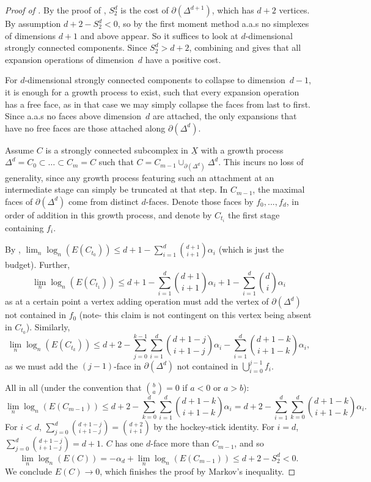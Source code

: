 \documentclass{article}
\theoremstyle{plain}
\theoremstyle{definition}
\theoremstyle{remark}
\newcommand{\di}{dimension}
\begin{document}
\begin{proof}[Proof of ]
    By the proof of , $S_2 ^d$ is the cost of $\partial(\Delta^{d+1})$, which has $d+2$ vertices. By assumption $d+2-S_2 ^d<0$, so by the first moment method a.a.s no simplexes of \di s $d+1$ and above appear. So it suffices to look at $d$-\di al strongly connected components.
    Since $S_2 ^d>d+2$, combining  and  gives that all expansion operations of \di \ $d$ have a positive cost.
        
    For $d$-\di al strongly connected components to collapse to \di \ $d-1$, it is enough for a growth process to exist, such that every expansion operation has a free face, as in that case we may simply collapse the faces from last to first. 
    Since a.a.s no faces above \di\ $d$ are attached, the only expansions that have no free faces are those attached along $\partial(\Delta^{d})$.

    Assume $C$ is a strongly connected subcomplex in $\underline{X}$ with a growth process $\Delta^d=C_0\subset \dots \subset C_m=C$ such that $C=C_{m-1}\cup_{\partial(\Delta^{d})} \Delta^d$. This incurs no loss of generality, since any growth process featuring such an attachment at an intermediate stage can simply be truncated at that step.
    In $C_{m-1}$, the maximal faces of $\partial(\Delta^{d})$ come from distinct $d$-faces. Denote those faces by $f_0,...,f_d$, in order of addition in this growth process, and denote by $C_{t_i}$ the first stage containing $f_i$.

    By , $\lim_n\log_n(E(C_{t_0}))\le d+1-\sum _{i=1}^d\binom{d+1}{i+1}\alpha_i$ (which is just the budget). 
    Further, 
    $$\lim_n\log_n(E(C_{t_1}))\le d+1-\sum _{i=1}^d\binom{d+1}{i+1}\alpha_i+1-\sum _{i=1}^d\binom{d}{i}\alpha_i$$
        as at a certain point a vertex adding operation must add the vertex of $\partial(\Delta^{d})$ not contained in $f_0$ (note- this claim is not contingent on this vertex being absent in $C_{t_0}$).
        Similarly, 
        $$\lim_n\log_n(E(C_{t_k}))\le d+2-\sum_{j=0}^{k-1}\sum _{i=1}^d\binom{d+1-j}{i+1-j}\alpha_i -\sum _{i=1}^d\binom{d+1-k}{i+1-k}\alpha_i,$$
        as we must add the $(j-1)$-face in $\partial(\Delta^{d})$ not contained in $\bigcup^{j-1}_{i=0}f_i$.

        All in all (under the convention that $\binom{b}{a}=0$ if $a<0$ or $a>b$): 
        $$\lim_n\log_n(E(C_{m-1}))\le d+2-\sum_{k=0}^{d}\sum _{i=1}^d\binom{d+1-k}{i+1-k}\alpha_i=d+2-\sum_{i=1}^{d}\sum _{k=0}^d\binom{d+1-k}{i+1-k}\alpha_i.$$
        For $i<d$, $\sum _{j=0}^d\binom{d+1-j}{i+1-j}=\binom{d+2}{i+1}$ by the hockey-stick identity. For $i=d$, $\sum _{j=0}^d\binom{d+1-j}{i+1-j}=d+1$. $C$ has one $d$-face more than $C_{m-1}$, and so 
        $$\lim_n\log_n(E(C))=-\alpha_d +\lim_n\log_n(E(C_{m-1}))\le d+2-S_2^d<0.$$
        We conclude $E(C)\to 0$, which finishes the proof by Markov's inequality.
\end{proof}
\end{document}
